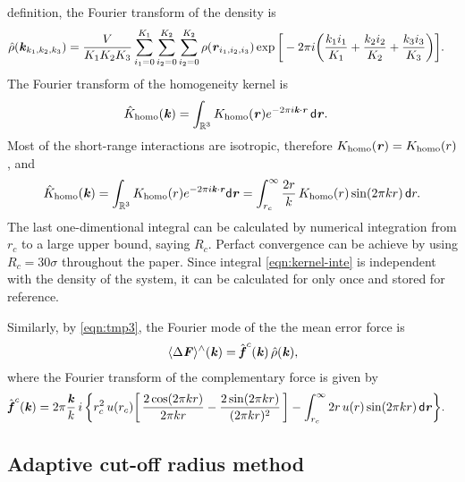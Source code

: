 \documentclass[aps,pre,preprint]{revtex4}
\renewcommand{\v}[1]{\textbf{\textit{#1}}}
\renewcommand{\d}[1]{\textsf{#1}}
\begin{document}
definition, the Fourier transform of the density is
\begin{align}
  \hat\rho(\v k_{k_1,k_2,k_3})
  & =
  \frac{V}{K_1K_2K_3}
  \sum_{i_1=0}^{K_1}\sum_{i_2=0}^{K_2}\sum_{i_2=0}^{K_2}
  \rho(\v r_{i_1,i_2,i_3})
  \exp\bigg[
  -2\pi i\bigg(
  \frac{k_1i_1}{K_1} + \frac{k_2i_2}{K_2} + \frac{k_3i_3}{K_3}
  \bigg)
  \bigg].
\end{align}
The Fourier transform of the homogeneity kernel is 
\begin{align}
  \hat K_{\textrm{homo}}(\v k)
  &=
  \int_{\mathbb R^3}K_{\textrm{homo}}(\v r)e^{-2\pi i\v k\cdot\v r}\,\d d\v r.
\end{align}
Most of the short-range interactions are isotropic, therefore
$K_{\textrm{homo}}(\v r) = K_{\textrm{homo}}(r)$, and
\begin{align}\label{eqn:kernel-inte}
  \hat{K}_{\textrm{homo}}(\v k)
  =
  \int_{\mathbb R^3}K_{\textrm{homo}}(r)e^{-2\pi i\v k\cdot\v r}\d d\v r
  =
  \int_{r_c}^\infty \frac{2 r}k\, K_{\textrm{homo}}(r) \sin(2\pi kr)\,\d dr.
\end{align}
The last one-dimentional integral can be calculated by numerical
integration from $r_c$ to a large upper bound, saying $R_c$. Perfact
convergence can be achieve by using $R_c = 30\sigma$ throughout the
paper. Since integral \eqref{eqn:kernel-inte} is independent with the
density of the system, it can be calculated for only once and stored
for reference.

Similarly, by \eqref{eqn:tmp3}, the Fourier mode of the the mean error
force is
\begin{align}\label{eqn:tmp17}
  \langle\Delta\v F\rangle^\wedge(\v k) =
  \hat{\v f}^c(\v k)\,
  \hat\rho(\v k),
\end{align}
where the Fourier transform of the complementary force is given by
\begin{align}\label{eqn:tmp18}
  \hat{\v f}^c(\v k) 
  & = 
  2\pi\frac{\v k}k\, i\,
  \bigg\{
  r_c^2\,u(r_c)
  \bigg[\,
  \frac{2\cos(2\pi kr)}{2\pi kr}
  -\frac{2\sin(2\pi kr)}{(2\pi kr)^2}
  \,\bigg] 
  -
  \int_{r_c}^\infty 2r\,u(r)\sin(2\pi kr)\,\d d\v r
  \bigg\}.
\end{align}


\subsection{Adaptive cut-off radius method}
\end{document}
